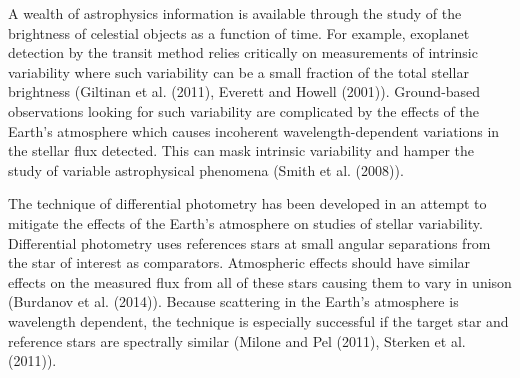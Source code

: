 \documentclass[]{elsarticle} %
\begin{document}
A wealth of astrophysics information is available through the study of
the brightness of celestial objects as a function of time. For example,
exoplanet detection by the transit method relies critically on
measurements of intrinsic variability where such variability can be a
small fraction of the total stellar brightness (Giltinan et al. (2011),
Everett and Howell (2001)). Ground-based observations looking for such
variability are complicated by the effects of the Earth's atmosphere
which causes incoherent wavelength-dependent variations in the stellar
flux detected. This can mask intrinsic variability and hamper the study
of variable astrophysical phenomena (Smith et al. (2008)).

The technique of differential photometry has been developed in an
attempt to mitigate the effects of the Earth's atmosphere on studies of
stellar variability. Differential photometry uses references stars at
small angular separations from the star of interest as comparators.
Atmospheric effects should have similar effects on the measured flux
from all of these stars causing them to vary in unison (Burdanov et al.
(2014)). Because scattering in the Earth's atmosphere is wavelength
dependent, the technique is especially successful if the target star and
reference stars are spectrally similar (Milone and Pel (2011), Sterken
et al. (2011)).
\end{document}
